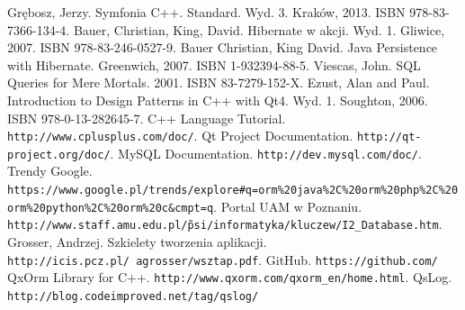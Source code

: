 \documentclass[12pt]{report}
\begin{document}
\begin{thebibliography}{99}
 Grębosz, Jerzy. Symfonia C++. Standard. Wyd. 3. Kraków, 2013. ISBN 978-83-7366-134-4.
 Bauer, Christian, King, David. Hibernate w akcji. Wyd. 1. Gliwice, 2007. ISBN 978-83-246-0527-9.
 Bauer Christian, King David. Java Persistence with Hibernate. Greenwich, 2007. ISBN 1-932394-88-5.
 Viescas, John. SQL Queries for Mere Mortals. 2001. ISBN 83-7279-152-X.
 Ezust, Alan and Paul. Introduction to Design Patterns in C++ with Qt4. Wyd. 1. Soughton, 2006. ISBN 978-0-13-282645-7.
 C++ Language Tutorial. {\tt http://www.cplusplus.com/doc/}.
Qt Project Documentation. {\tt http://qt-project.org/doc/}.
 MySQL Documentation. {\tt http://dev.mysql.com/doc/}.
 Trendy Google. {\tt https://www.google.pl/trends/explore\#q=orm\%20\-java\%2C\%20orm\%20php\%2C\%20orm\%20python\%2C\%20orm\%20c\&cmpt=q}.
 Portal UAM w Poznaniu. {\tt http://www.staff.amu.edu.pl/\~psi/\-informatyka/kluczew/I2\_Database.htm}.
 Grosser, Andrzej. Szkielety tworzenia aplikacji. {\tt http://icis.pcz.pl/~agrosser/wsztap.pdf}.
 GitHub. {\tt https://github.com/}
 QxOrm Library for C++. {\tt http://www.qxorm.com/qxorm\_en/home.html}.
 QsLog. {\tt http://blog.codeimproved.net/tag/qslog/}
\end{thebibliography}

\listoffigures

\listoftables

\lstlistoflistings
\end{document}
